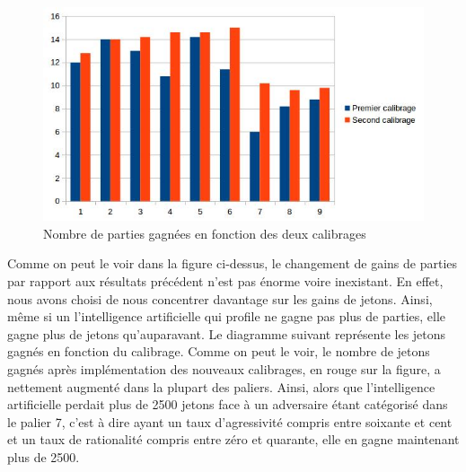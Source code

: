 \documentclass{report}
\begin{document}



\begin{figure}[H]
	\begin{center}
		\includegraphics[scale=0.5]{./imagesRapport/NombrePartiesGagneesEnFonctionCalibrage.jpg}
	\end{center}
	\caption{Nombre de parties gagnées en fonction des deux calibrages}
\end{figure}

Comme on peut le voir dans la figure ci-dessus, le changement de gains de parties par rapport aux résultats précédent n'est pas énorme voire inexistant. En effet, nous avons choisi de nous concentrer davantage sur les gains de jetons. Ainsi, même si un l'intelligence artificielle qui profile ne gagne pas plus de parties, elle gagne plus de jetons qu’auparavant. Le diagramme suivant représente les jetons gagnés en fonction du calibrage. Comme on peut le voir, le nombre de jetons gagnés après implémentation des nouveaux calibrages, en rouge sur la figure, a nettement augmenté dans la plupart des paliers. Ainsi, alors que l'intelligence artificielle perdait plus de 2500 jetons face à un adversaire étant catégorisé dans le palier 7, c'est à dire ayant un taux d'agressivité compris entre soixante et cent et un taux de rationalité compris entre zéro et quarante, elle en gagne maintenant plus de 2500.
\end{document}
